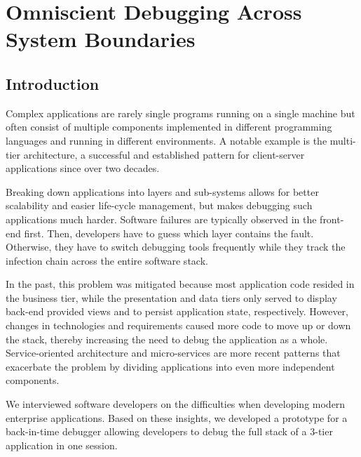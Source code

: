 \chapter{Omniscient Debugging Across System Boundaries}


%

\tmpStart

\section{Introduction}
\label{sec:introduction}

Complex applications are rarely single programs running on a single machine but often consist of multiple components implemented in different programming languages and running in different environments.
A notable example is the multi-tier architecture, a successful and established pattern for client-server applications since over two decades.

Breaking down applications into layers and sub-systems allows for better scalability and easier life-cycle management, but makes debugging such applications much harder.
Software failures are typically observed in the front-end first.
Then, developers have to guess which layer contains the fault. 
Otherwise, they have to switch debugging tools frequently while they track the infection chain across the entire software stack.

In the past, this problem was mitigated because most application code resided in the business tier, while the presentation and data tiers only served to display back-end provided views and to persist application state, respectively.
However, changes in technologies and requirements caused more code to move up or down the stack, thereby increasing the need to debug the application as a whole.
Service-oriented architecture and micro-services are more recent patterns that exacerbate the problem by dividing applications into even more independent components.

We interviewed software developers on the difficulties when developing modern enterprise applications.
Based on these insights, we developed a prototype for a back-in-time debugger allowing developers to debug the full stack of a 3-tier application in one session.

